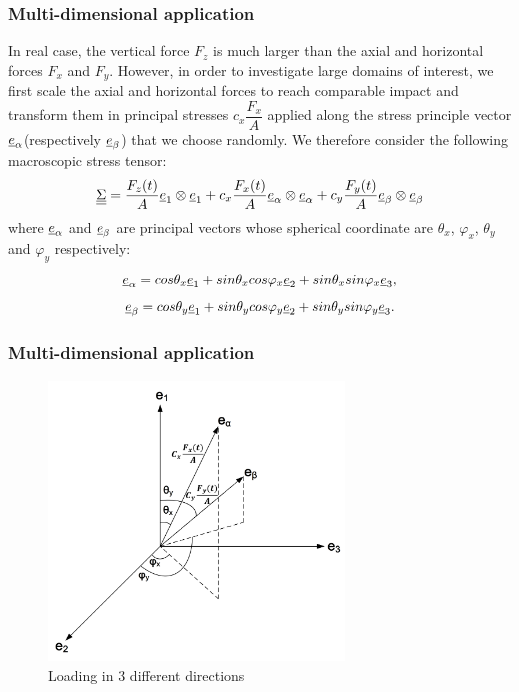\documentclass[xcolor=table]{Bredelebeamer}
\begin{document}
\begin{frame}
	\frametitle{Multi-dimensional application}
 In real case, the vertical force $F_z$ is much larger than the axial and horizontal forces $F_x$ and $F_y$. However, in order to investigate large domains of interest, we first scale the axial and horizontal forces to reach comparable impact and transform them in principal stresses $c_x\dfrac{F_x}{A}$ applied along the stress principle vector $\uline{e}_\alpha$(respectively $\uline{e}_\beta$) that we choose randomly. We therefore consider the following macroscopic stress tensor:
 \begin{equation}
 \uline{\uline{\Sigma}}=\dfrac{F_z(t)}{A}\uline{e}_1\otimes \uline{e}_1+c_x\dfrac{F_x(t)}{A}\uline{e}_{\alpha}\otimes \uline{e}_{\alpha}+c_y\dfrac{F_y(t)}{A}\uline{e}_{\beta}\otimes \uline{e}_{\beta}
 \label{tensor1}
 \end{equation}
 where $\uline{e}_{\alpha}$  and $\uline{e}_{\beta}$ are principal vectors whose spherical coordinate are $\theta_x$, $\varphi_x$,  $\theta_y$ and $\varphi_y$ respectively:
 $$\uline{e}_{\alpha}=cos\theta_x\uline{e}_1+sin\theta_xcos\varphi_x\uline{e}_2+sin\theta_xsin\varphi_x\uline{e}_3,$$
 $$\uline{e}_{\beta}=cos\theta_y\uline{e}_1+sin\theta_ycos\varphi_y\uline{e}_2+sin\theta_ysin\varphi_y\uline{e}_3.$$


\end{frame}

\begin{frame}
	\frametitle{Multi-dimensional application}
  \begin{figure}[!h]
  	\centering
  	\includegraphics[width=0.7\textwidth]{figures//xab.png} 
  	\caption{Loading in 3 different directions}
  	\label{xab}
  \end{figure}
\end{frame}	
\end{document}
